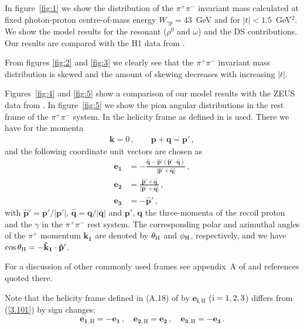 \documentclass[a4paper,11pt]{article}
\newcommand{\nn}{\nonumber}
\begin{document}
In figure~\ref{fig:1} we show the distribution of the $\pi^{+} \pi^{-}$
invariant mass calculated at fixed photon-proton centre-of-mass energy
$W_{\gamma p} = 43$~GeV and for $|t| < 1.5$~GeV$^{2}$.
We show the model results for the resonant ($\rho^{0}$ and $\omega$)
and the DS contributions.
Our results are compared with the H1 data from \cite{H1:2020lzc}.

From figures \ref{fig:2} and \ref{fig:3} we clearly see
that the $\pi^{+}\pi^{-}$ invariant mass distribution is skewed 
and the amount of skewing decreases with increasing $|t|$.

Figures~\ref{fig:4} and \ref{fig:5} show a comparison
of our model results with the ZEUS data from \cite{ZEUS:1997rof}.
In figure~\ref{fig:5} we show the pion angular distributions
in the rest frame of the $\pi^{+}\pi^{-}$ system.
In \cite{ZEUS:1997rof} the helicity frame as defined in
\cite{Schilling:1969um,Schilling:1973ag} is used.
There we have for the momenta
%
\begin{eqnarray}
\mathbf{k} = 0\,, \qquad \mathbf{p} + \mathbf{q} = \mathbf{p'} \,,
\label{3.100}
\end{eqnarray}
%
and the following coordinate unit vectors are chosen as
%
\begin{align}
\mathbf{e}_{\mathbf{1}}  &=  
- \frac{\mathbf{\hat{q}} - \mathbf{\hat{p}'} (\mathbf{\hat{p}'} \cdot \mathbf{\hat{q}})}{|\mathbf{\hat{p}'} \times \mathbf{\hat{q}}|}
\,, \nn \\
\mathbf{e}_{\mathbf{2}}  &=  
\frac{\mathbf{\hat{p}'} \times \mathbf{\hat{q}}}{|\mathbf{\hat{p}'} \times \mathbf{\hat{q}}|}
\,, \nn \\
\mathbf{e}_{\mathbf{3}}  &= 
\mathbf{-\hat{p}'} \,,
\label{3.101}
\end{align}
%
with $\mathbf{\hat{p}'} = \mathbf{p}' / |\mathbf{p}'|$,
$\mathbf{\hat{q}} = \mathbf{q} / |\mathbf{q}|$
and $\mathbf{p}'$, $\mathbf{q}$ the three-momenta of the recoil proton
and the $\gamma$ in the $\pi^{+}\pi^{-}$ rest system.
The corresponding polar and azimuthal angles of the $\pi^{+}$
momentum $\mathbf{k_{1}}$ are denoted 
by $\theta_{\rm H}$ and $\phi_{\rm H}$, respectively,
and we have 
$\cos \theta_{\rm H} = -\mathbf{\hat{k}_{1}} \cdot \mathbf{\hat{p}'}$.

For a discussion of other commonly used frames see
appendix~A of \cite{Bolz:2014mya}
and references quoted there.

Note that the helicity frame defined in (A.18) of \cite{Bolz:2014mya} 
by $\mathbf{e}_{\mathbf{i},\mathrm{H}}$
(${\rm i} = 1, 2, 3$)
differs from (\ref{3.101}) by sign changes:
%
\begin{align}
\mathbf{e}_{\mathbf{1},\mathrm{H}} = -\mathbf{e}_{\mathbf{1}}\,,
\quad 
\mathbf{e}_{\mathbf{2},\mathrm{H}} =  \mathbf{e}_{\mathbf{2}}\,,\quad 
\mathbf{e}_{\mathbf{3},\mathrm{H}} = -\mathbf{e}_{\mathbf{3}}\,.
\label{3.102}
\end{align}
%
\end{document}
